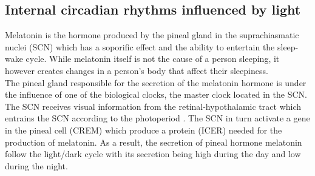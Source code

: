 \subsection{Internal circadian rhythms influenced by light}
Melatonin is the hormone produced by the pineal gland in the suprachiasmatic nuclei (SCN) which has a soporific effect and the ability to entertain the sleep-wake cycle. While melatonin itself is not the cause of a person sleeping, it however creates changes in a person's body that affect their sleepiness. \\
The pineal gland responsible for the secretion of the melatonin hormone is under the influence of one of the biological clocks, the master clock located in the SCN. The SCN receives visual information from the retinal-hypothalamic tract which entrains the SCN according to the photoperiod \cite{lig1994}. The SCN in turn activate a gene in the pineal cell (CREM) which produce a protein (ICER) needed for the production of melatonin. As a result, the secretion of pineal hormone melatonin follow the light/dark cycle with its  secretion being high during the day and low during the night.  

